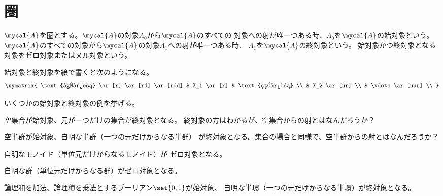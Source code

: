 \section{圏}\label{s1:圏} %
	\begin{definition}[始対象と終対象]\label{def:始対象と終対象} %
		$\mycal{A}$を圏とする。$\mycal{A}$の対象$A_0$から$\mycal{A}$のすべての
		対象への射が唯一つある時、$A_0$を$\mycal{A}$の始対象という。
		$\mycal{A}$のすべての対象から$\mycal{A}$の対象$A_1$への射が唯一つある時、
		$A_1$を$\mycal{A}$の終対象という。
		始対象かつ終対象となる対象をゼロ対象またはヌル対象という。
	\end{definition} %

	始対象と終対象を絵で書くと次のようになる。
	\begin{equation*}\xymatrix{
		\text{始対象} \ar[r] \ar[rd] \ar[rdd] & X_1 \ar[r] & \text{終対象} \\
		& X_2 \ar[ur] \\
		& \vdots \ar[uur] \\
	}\end{equation*}

	\begin{example}[始対象と終対象の例]\label{eg:始対象と終対象の例} %
		いくつかの始対象と終対象の例を挙げる。
		\begin{description}\setlength{\itemsep}{-1mm} %
			\item[集合] 空集合が始対象、元が一つだけの集合が終対象となる。
			終対象の方はわかるが、空集合からの射とはなんだろうか？
			\item[半群] 空半群が始対象、自明な半群（一つの元だけからなる半群）
			が終対象となる。集合の場合と同様で、空半群からの射とはなんだろうか？
			\item[モノイド] 自明なモノイド（単位元だけからなるモノイド）が
			ゼロ対象となる。
			\item[群] 自明な群（単位元だけからなる群）がゼロ対象となる。
			\item[乗法の単位元をもつ半環]
			論理和を加法、論理積を乗法とするブーリアン$\set{0,1}$が始対象、
			自明な半環（一つの元だけからなる半環）が終対象となる。
		\end{description} %
	\end{example} %
